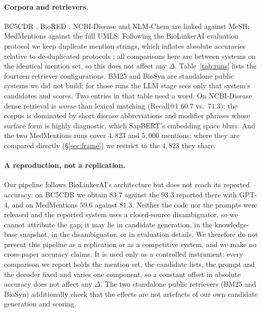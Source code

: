 \documentclass[11pt]{article}
\makeatletter
\newcommand{\rone}{Recall@1}
\makeatother
\begin{document}
\paragraph{Corpora and retrievers.}
BC5CDR \citep{li-etal-2016-biocreative}, BioRED \citep{luo-etal-2022-biored},
NCBI-Disease \citep{dogan-etal-2014-ncbi} and NLM-Chem
\citep{islamaj-etal-2021-nlmchem} are linked against MeSH; MedMentions
\citep{mohan-li-2019-medmentions} against the full UMLS. Following the BioLinkerAI
evaluation protocol we keep duplicate mention strings, which inflates absolute
accuracies relative to de-duplicated protocols \citep{tutubalina-etal-2020-fair}; all
comparisons here are between systems on the identical mention set, so this does not
affect any $\Delta$. Table~\ref{tab:runs} lists the fourteen retriever
configurations. BM25 and BioSyn are standalone public systems we did not build; for
those runs the LLM stage sees only that system's candidates and scores. Two entries in
that table need a word. On NCBI-Disease dense retrieval is \emph{worse} than lexical
matching (\rone{} $60.7$ vs.\ $71.3$): the corpus is dominated by short disease
abbreviations and modifier phrases whose surface form is highly diagnostic, which
SapBERT's embedding space blurs. And the two MedMentions runs cover $4{,}823$ and
$5{,}000$ mentions; where they are compared directly (\S\ref{sec:frame}) we restrict to
the $4{,}823$ they share.

\paragraph{A reproduction, not a replication.}
Our pipeline follows BioLinkerAI's architecture but does not reach its reported
accuracy: on BC5CDR we obtain $83.7$ against the $93.3$ reported there with GPT-4, and
on MedMentions $59.6$ against $81.3$. Neither the code nor the prompts were released
and the reported system uses a closed-source disambiguator, so we cannot attribute the
gap; it may lie in candidate generation, in the knowledge-base snapshot, in the
disambiguator, or in evaluation details. We therefore do not present this pipeline as
a replication or as a competitive system, and we make no cross-paper accuracy claims.
It is used only as a controlled instrument: every comparison we report holds the
mention set, the candidate lists, the prompt and the decoder fixed and varies one
component, so a constant offset in absolute accuracy does not affect any $\Delta$. The
two standalone public retrievers (BM25 and BioSyn) additionally check that the effects
are not artefacts of our own candidate generation and scoring.
\end{document}
